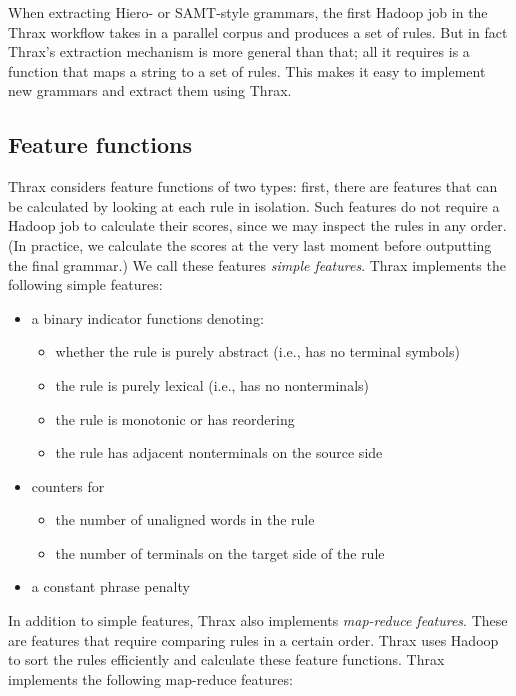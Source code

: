 \documentclass[11pt]{article}
\begin{document}
When extracting Hiero- or SAMT-style grammars, the first Hadoop job in the Thrax workflow takes in a parallel corpus and produces a set of rules. But in fact Thrax's extraction mechanism is more general than that; all it requires is a function that maps a string to a set of rules. This makes it easy to implement new grammars and extract them using Thrax.

\subsection{Feature functions}
\label{features}

Thrax considers feature functions of two types: first, there are features that can be calculated by looking at each rule in isolation. Such features do not require a Hadoop job to calculate their scores, since we may inspect the rules in any order. (In practice, we calculate the scores at the very last moment before outputting the final grammar.) We call these features {\em simple features}. Thrax implements the following simple features:
\begin{itemize}
\item a binary indicator functions denoting:
  \begin{itemize}
  \item whether the rule is purely abstract (i.e., has no terminal
    symbols)
  \item the rule is purely lexical (i.e., has no nonterminals)
  \item the rule is monotonic or has reordering
  \item the rule has adjacent nonterminals on the source side
  \end{itemize}
\item counters for
  \begin{itemize}
  \item the number of unaligned words in the rule
  \item the number of terminals on the target side of the rule
  \end{itemize}
\item a constant phrase penalty
\end{itemize}
In addition to simple features, Thrax also implements {\em map-reduce features}. These are features that require comparing rules in a certain order. Thrax uses Hadoop to sort the rules efficiently and calculate these feature functions. Thrax implements the following map-reduce features:
\end{document}
